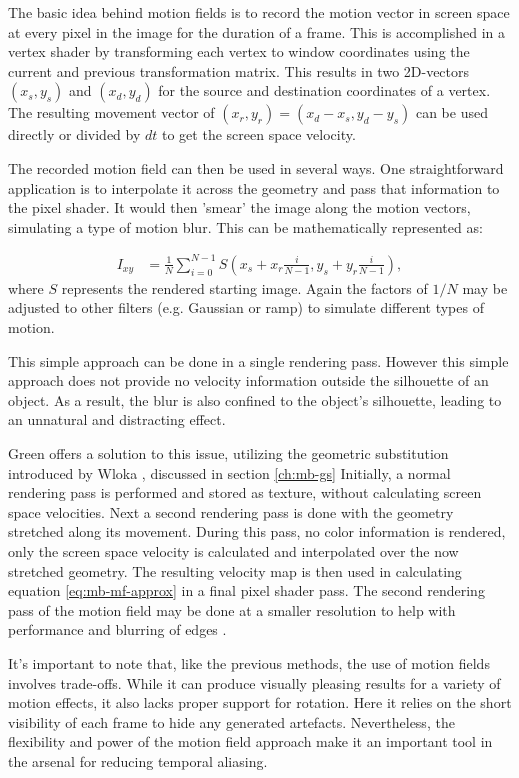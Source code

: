 The basic idea behind motion fields is to record the motion vector in screen space at every pixel in the image for the duration of a frame.
This is accomplished in a vertex shader by transforming each vertex to window coordinates using the current and previous transformation matrix.
This results in two 2D-vectors $(x_s,y_s)$ and $(x_d,y_d)$ for the source and destination coordinates of a vertex.
The resulting movement vector of $(x_r,y_r) = (x_d - x_s,y_d - y_s)$ can be used directly or divided by $dt$ to get the screen space velocity.

The recorded motion field can then be used in several ways.
One straightforward application is to interpolate it across the geometry and pass that information to the pixel shader.
It would then 'smear' the image along the motion vectors, simulating a type of motion blur.
This can be mathematically represented as:

\begin{align}
    I_{xy} &= \frac{1}{N} \sum_{i=0}^{N-1}  S(x_s + x_r \frac{i}{N-1}, y_s + y_r \frac{i}{N-1}),
    \label{eq:mb-mf-approx}
\end{align}
where $S$ represents the rendered starting image.
Again the factors of $1/N$ may be adjusted to other filters (e.g. Gaussian or ramp) to simulate different types of motion.

This simple approach can be done in a single rendering pass.
However this simple approach does not provide no velocity information outside the silhouette of an object.
As a result, the blur is also confined to the object's silhouette, leading to an unnatural and distracting effect.

Green \cite{Green.2003} offers a solution to this issue, utilizing the geometric substitution introduced by Wloka \cite{Wloka.1996}, discussed in section \ref{ch:mb-gs}
Initially, a normal rendering pass is performed and stored as texture, without calculating screen space velocities.
Next a second rendering pass is done with the geometry stretched along its movement.
During this pass, no color information is rendered, only the screen space velocity is calculated and interpolated over the now stretched geometry.
The resulting velocity map is then used in calculating equation \ref{eq:mb-mf-approx} in a final pixel shader pass.
The second rendering pass of the motion field may be done at a smaller resolution to help with performance and blurring of edges \cite{Sousa.2008}.

It's important to note that, like the previous methods, the use of motion fields involves trade-offs. 
While it can produce visually pleasing results for a variety of motion effects, it also lacks proper support for rotation.
Here it relies on the short visibility of each frame to hide any generated artefacts.
Nevertheless, the flexibility and power of the motion field approach make it an important tool in the arsenal for reducing temporal aliasing.